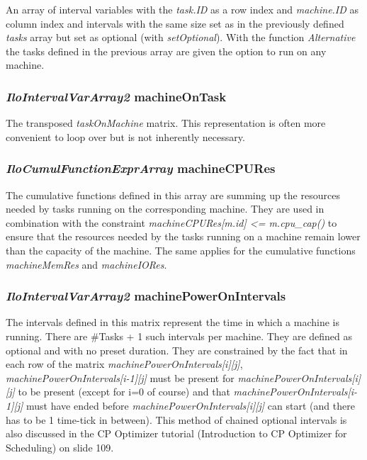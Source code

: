An array of interval variables with the \textit{task.ID} as a row index and \textit{machine.ID} as column index and intervals with the same size set as in the previously defined \textit{tasks} array but set as optional (with \textit{setOptional}).
With the function \textit{Alternative} the tasks defined in the previous array are given the option to run on any machine. 

\subsubsection{\textit{IloIntervalVarArray2} machineOnTask}

The transposed \textit{taskOnMachine} matrix. This representation is often more convenient to loop over but is not inherently necessary. 

\subsubsection{\textit{IloCumulFunctionExprArray} machineCPURes}

The cumulative functions defined in this array are summing up the resources needed by tasks running on the corresponding machine. They are used in combination with the constraint \textit{machineCPURes[m.id] <= m.cpu\_cap()} to ensure that the resources needed by the tasks running on a machine remain lower than the capacity of the machine. The same applies for the cumulative functions \textit{machineMemRes} and \textit{machineIORes}.

\subsubsection{\textit{IloIntervalVarArray2} machinePowerOnIntervals}

The intervals defined in this matrix represent the time in which a machine is running. There are #Tasks + 1 such intervals per machine. They are defined as optional and with no preset duration. They are constrained by the fact that in each row of the matrix \textit{machinePowerOnIntervals[i][j]}, \textit{machinePowerOnIntervals[i-1][j]} must be present for \textit{machinePowerOnIntervals[i][j]} to be present (except for i=0 of course) and that \textit{machinePowerOnIntervals[i-1][j]} must have ended before \textit{machinePowerOnIntervals[i][j]} can start (and there has to be 1 time-tick in between). This method of chained optional intervals is also discussed in the CP Optimizer tutorial (Introduction to CP Optimizer for Scheduling) on slide 109.

